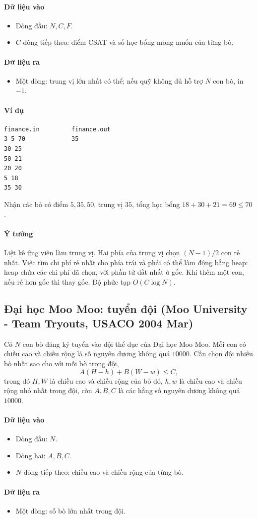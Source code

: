 \documentclass[11pt]{article}
\newcommand{\problem}[1]{\subsection{#1}}
\newcommand{\iosec}[1]{\paragraph{#1}}
\newcommand{\bigO}[1]{\ensuremath{O(#1)}}
\begin{document}
\iosec{Dữ liệu vào}
\begin{itemize}
  \item Dòng đầu: \(N,C,F\).
  \item \(C\) dòng tiếp theo: điểm CSAT và số học bổng mong muốn của từng bò.
\end{itemize}

\iosec{Dữ liệu ra}
\begin{itemize}
  \item Một dòng: trung vị lớn nhất có thể; nếu quỹ không đủ hỗ trợ \(N\) con bò, in \(-1\).
\end{itemize}

\iosec{Ví dụ}
\begin{verbatim}
finance.in         finance.out
3 5 70             35
30 25
50 21
20 20
5 18
35 30
\end{verbatim}

Nhận các bò có điểm \(5,35,50\), trung vị \(35\), tổng học bổng \(18+30+21=69\le70\).

\iosec{Ý tưởng}
Liệt kê ứng viên làm trung vị. Hai phía của trung vị chọn \((N-1)/2\) con rẻ nhất. Việc tìm chi phí rẻ nhất cho phía trái và phải có thể làm động bằng heap: heap chứa các chi phí đã chọn, với phần tử đắt nhất ở gốc. Khi thêm một con, nếu rẻ hơn gốc thì thay gốc. Độ phức tạp \(\bigO{C\log N}\).

\problem{Đại học Moo Moo: tuyển đội (Moo University - Team Tryouts, USACO 2004 Mar)}

Có \(N\) con bò đăng ký tuyển vào đội thể dục của Đại học Moo Moo. Mỗi con có chiều cao và chiều rộng là số nguyên dương không quá \(10000\). Cần chọn đội nhiều bò nhất sao cho với mỗi bò trong đội,
\[
  A(H-h)+B(W-w)\le C,
\]
trong đó \(H,W\) là chiều cao và chiều rộng của bò đó, \(h,w\) là chiều cao và chiều rộng nhỏ nhất trong đội, còn \(A,B,C\) là các hằng số nguyên dương không quá \(10000\).

\iosec{Dữ liệu vào}
\begin{itemize}
  \item Dòng đầu: \(N\).
  \item Dòng hai: \(A,B,C\).
  \item \(N\) dòng tiếp theo: chiều cao và chiều rộng của từng bò.
\end{itemize}

\iosec{Dữ liệu ra}
\begin{itemize}
  \item Một dòng: số bò lớn nhất trong đội.
\end{itemize}
\end{document}
